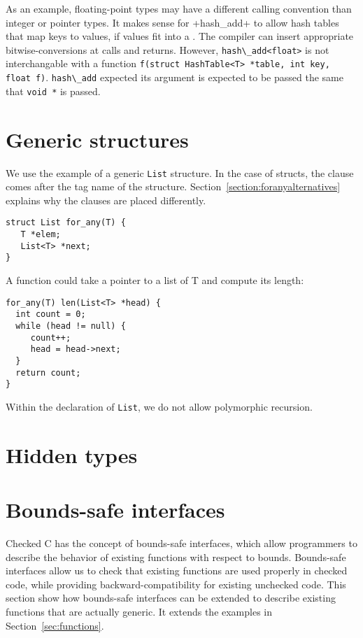 As an example, floating-point types may have a different calling convention
than integer or pointer types.  It makes sense for +hash\_add+ to allow
hash tables that map keys to  values, if 
values fit into a .  The compiler can insert appropriate 
bitwise-conversions at calls and returns.   However, \lstinline+hash\_add<float>+
is not interchangable with a function \lstinline+f(struct HashTable<T> *table, int key, float f)+.
\lstinline+hash\_add+ expected its argument is expected to be passed the same that \lstinline+void *+ 
is passed.

\section{Generic structures}
We use the example of a generic \lstinline+List+ structure.   In the case of structs,
the \forany{} clause comes after the tag name of the structure.  
Section~\ref{section:foranyalternatives} explains why the \forany{} clauses 
are placed differently.
\begin{lstlisting}
struct List for_any(T) { 
   T *elem;
   List<T> *next;
}
\end{lstlisting}
A function could take a pointer to a list of T and compute its length:
\begin{lstlisting}
for_any(T) len(List<T> *head) {
  int count = 0;
  while (head != null) {
     count++;
     head = head->next;
  }
  return count;
}
\end{lstlisting}
Within the declaration of \lstinline+List+, we do not allow polymorphic recursion.

\section{Hidden types}

\section{Bounds-safe interfaces}
\label{sec:bounds-safe-interfaces}
Checked C has the concept of bounds-safe interfaces, which allow programmers
to describe the behavior of existing functions with respect to bounds.  Bounds-safe
interfaces allow us to check that existing functions are used properly in 
checked code, while providing backward-compatibility for existing unchecked code.
This section show how bounds-safe interfaces can be extended to describe
existing functions that are actually generic.  It extends the examples
in Section~\ref{sec:functions}.

